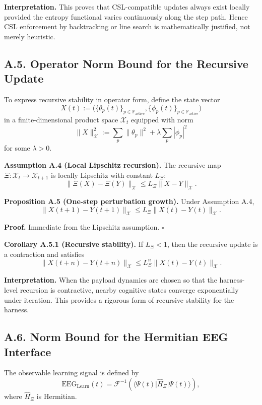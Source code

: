 \documentclass[11pt]{article}
\begin{document}
\textbf{Interpretation.}
This proves that CSL-compatible updates always exist locally provided the entropy functional varies continuously along the step path. Hence CSL enforcement by backtracking or line search is mathematically justified, not merely heuristic.

\subsection*{A.5. Operator Norm Bound for the Recursive Update}

To express recursive stability in operator form, define the state vector
\[
X(t) := \big(\{\theta_p(t)\}_{p\in\mathbb{P}_{\mathrm{active}}}, \{\phi_p(t)\}_{p\in\mathbb{P}_{\mathrm{active}}}\big)
\]
in a finite-dimensional product space $\mathcal{X}_t$ equipped with norm
\[
\|X\|_{\mathcal{X}}^2
:=
\sum_{p}\|\theta_p\|^2 + \lambda \sum_p |\phi_p|^2
\]
for some $\lambda>0$.

\textbf{Assumption A.4 (Local Lipschitz recursion).}
The recursive map $\Xi:\mathcal{X}_t\to \mathcal{X}_{t+1}$ is locally Lipschitz with constant $L_\Xi$:
\[
\|\Xi(X)-\Xi(Y)\|_{\mathcal{X}}
\le
L_\Xi \|X-Y\|_{\mathcal{X}}.
\]

\textbf{Proposition A.5 (One-step perturbation growth).}
Under Assumption A.4,
\[
\|X(t+1)-Y(t+1)\|_{\mathcal{X}}
\le
L_\Xi \|X(t)-Y(t)\|_{\mathcal{X}}.
\]

\textbf{Proof.}
Immediate from the Lipschitz assumption. \hfill $\square$

\textbf{Corollary A.5.1 (Recursive stability).}
If $L_\Xi<1$, then the recursive update is a contraction and satisfies
\[
\|X(t+n)-Y(t+n)\|_{\mathcal{X}}
\le
L_\Xi^n \|X(t)-Y(t)\|_{\mathcal{X}}.
\]

\textbf{Interpretation.}
When the payload dynamics are chosen so that the harness-level recursion is contractive, nearby cognitive states converge exponentially under iteration. This provides a rigorous form of recursive stability for the harness.

\subsection*{A.6. Norm Bound for the Hermitian EEG Interface}

The observable learning signal is defined by
\[
\mathrm{EEG}_{\mathrm{Learn}}(t)
=
\mathcal{F}^{-1}\!\left(
\langle \Psi(t)\vert \hat{H}_\Xi \vert \Psi(t)\rangle
\right),
\]
where $\hat{H}_\Xi$ is Hermitian. \cite{neuroplasticityMT,QuantumEEG1}
\end{document}
